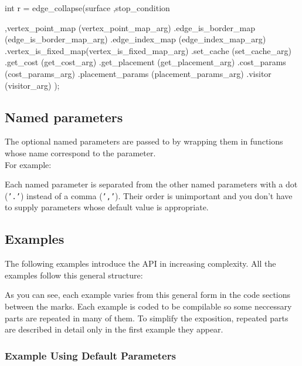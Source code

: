 \begin{cprog}
int r = edge_collapse(surface
                     ,stop_condition
                     
                     ,vertex_point_map   (vertex_point_map_arg)
                     .edge_is_border_map (edge_is_border_map_arg)
                     .edge_index_map     (edge_index_map_arg)
                     .vertex_is_fixed_map(vertex_is_fixed_map_arg)
                     .set_cache          (set_cache_arg)
                     .get_cost           (get_cost_arg)
                     .get_placement      (get_placement_arg)
                     .cost_params        (cost_params_arg)
                     .placement_params   (placement_params_arg)
                     .visitor            (visitor_arg)
                     );
\end{cprog}

\subsection{Named parameters}

The optional named parameters are passed to 
by wrapping them in functions whose name correspond to the parameter.\\
For example: 

Each named parameter is separated from the other named parameters
with a dot ({\tt '.'}) instead of a comma ({\tt ','}).
Their order is unimportant and you don't have to supply parameters
whose default value is appropriate.


\subsection{Examples}

The following examples introduce the API in increasing complexity. All the examples follow this general structure:


As you can see, each example varies from this general form in the code sections between the marks.
Each example is coded to be compilable so some neccessary parts are repeated in many of them. To simplify the exposition, repeated parts are described in detail only in the first example they appear.

\subsubsection{Example Using Default Parameters}

